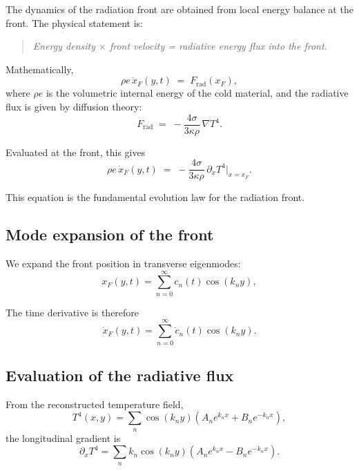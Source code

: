 \documentclass{article}
\begin{document}
The dynamics of the radiation front are obtained from local energy balance at the front.  
The physical statement is:

\begin{quote}
\emph{Energy density $\times$ front velocity = radiative energy flux into the front.}
\end{quote}

Mathematically,
\begin{equation}
\rho e \, \dot{x}_F(y,t) \;=\; F_{\text{rad}}(x_F),
\end{equation}
where $\rho e$ is the volumetric internal energy of the cold material, and the radiative flux is given by diffusion theory:
\begin{equation}
F_{\text{rad}} \;=\; -\frac{4\sigma}{3\kappa\rho}\,\nabla T^4.
\end{equation}

Evaluated at the front, this gives
\begin{equation}
\rho e\, \dot{x}_F(y,t)
\;=\;
-\frac{4\sigma}{3\kappa\rho}\,
\partial_x T^4\big|_{x=x_F}.
\label{eq:front_balance}
\end{equation}

This equation is the fundamental evolution law for the radiation front.

\subsection{Mode expansion of the front}

We expand the front position in transverse eigenmodes:
\begin{equation}
x_F(y,t) = \sum_{n=0}^{\infty} c_n(t)\cos(k_n y),
\end{equation}

The time derivative is therefore
\begin{equation}
\dot{x}_F(y,t) = \sum_{n=0}^{\infty} \dot{c}_n(t)\cos(k_n y).
\end{equation}

\subsection{Evaluation of the radiative flux}

From the reconstructed temperature field,
\[
T^4(x,y) = \sum_n \cos(k_n y)\left(A_n e^{k_n x} + B_n e^{-k_n x}\right),
\]
the longitudinal gradient is
\begin{equation}
\partial_x T^4
=
\sum_n k_n \cos(k_n y)\left(A_n e^{k_n x} - B_n e^{-k_n x}\right).
\end{equation}
\end{document}
